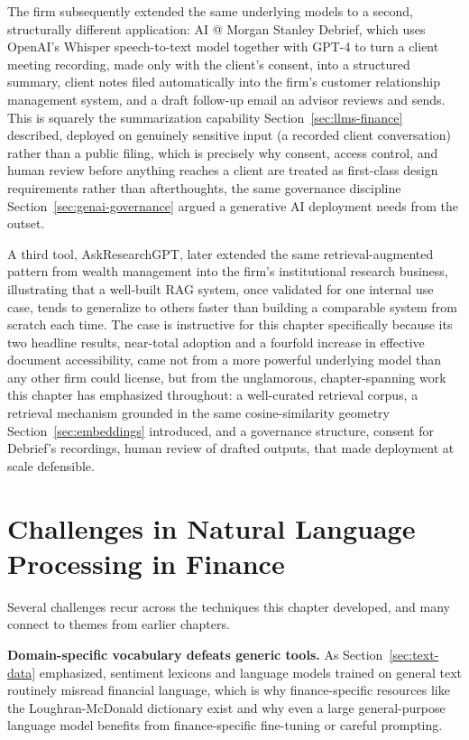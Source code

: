 \documentclass[../ai_in_finance]{subfiles}
\begin{document}
The firm subsequently extended the same underlying models to a second, structurally different application: AI @ Morgan Stanley Debrief, which uses OpenAI's Whisper speech-to-text model together with GPT-4 to turn a client meeting recording, made only with the client's consent, into a structured summary, client notes filed automatically into the firm's customer relationship management system, and a draft follow-up email an advisor reviews and sends. This is squarely the summarization capability Section~\ref{sec:llms-finance} described, deployed on genuinely sensitive input (a recorded client conversation) rather than a public filing, which is precisely why consent, access control, and human review before anything reaches a client are treated as first-class design requirements rather than afterthoughts, the same governance discipline Section~\ref{sec:genai-governance} argued a generative AI deployment needs from the outset.

A third tool, AskResearchGPT, later extended the same retrieval-augmented pattern from wealth management into the firm's institutional research business, illustrating that a well-built RAG system, once validated for one internal use case, tends to generalize to others faster than building a comparable system from scratch each time. The case is instructive for this chapter specifically because its two headline results, near-total adoption and a fourfold increase in effective document accessibility, came not from a more powerful underlying model than any other firm could license, but from the unglamorous, chapter-spanning work this chapter has emphasized throughout: a well-curated retrieval corpus, a retrieval mechanism grounded in the same cosine-similarity geometry Section~\ref{sec:embeddings} introduced, and a governance structure, consent for Debrief's recordings, human review of drafted outputs, that made deployment at scale defensible.

\section{Challenges in Natural Language Processing in Finance}

Several challenges recur across the techniques this chapter developed, and many connect to themes from earlier chapters.

\textbf{Domain-specific vocabulary defeats generic tools.} As Section~\ref{sec:text-data} emphasized, sentiment lexicons and language models trained on general text routinely misread financial language, which is why finance-specific resources like the Loughran-McDonald dictionary exist and why even a large general-purpose language model benefits from finance-specific fine-tuning or careful prompting.
\end{document}
